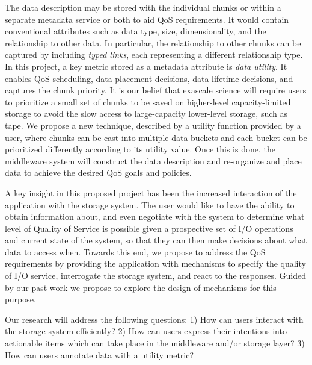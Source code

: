 The data description may be stored with the individual chunks or within a
separate metadata service or both to aid QoS requirements. It would contain
conventional attributes such as data type, size, dimensionality, and the
relationship to other data. In particular, the relationship to other chunks can
be captured by including \textit{typed links}, each representing a different
relationship type.  In this project, a key metric stored as a metadata
attribute is \textit{data utility}.  It enables QoS scheduling, data placement
decisions, data lifetime decisions, and captures the chunk priority. It is
our belief that exascale science will require users to prioritize a small set
of chunks to be saved on higher-level capacity-limited storage to avoid the
slow access to large-capacity lower-level storage, such as tape.  We propose a
new technique, described by a utility function provided by a user, where chunks
can be cast into multiple data buckets and each bucket can be prioritized
differently according to its utility value.  Once this is done, the middleware
system will construct the data description and re-organize and place data to
achieve the desired QoS goals and policies.

A key insight in this proposed project has been the increased interaction of
the application with the storage system.
The user would like to have the ability to obtain information about, and even
negotiate with the system to determine what
level of Quality of Service is possible given
a prospective set of I/O operations and current state of the system, so that
they can then make decisions about what data to access when.
Towards this end, we propose to
address the QoS requirements by providing the application with mechanisms to
specify the quality of I/O service, interrogate the storage system, and react
to the responses. Guided by our past work we propose to explore the design of
mechanisms for this purpose. 

Our research will address the following questions:
1) How can users interact with the storage system efficiently?
2) How can users express their intentions into actionable items which can take place in the middleware and/or storage layer?
3) How can users annotate data with a utility metric?

